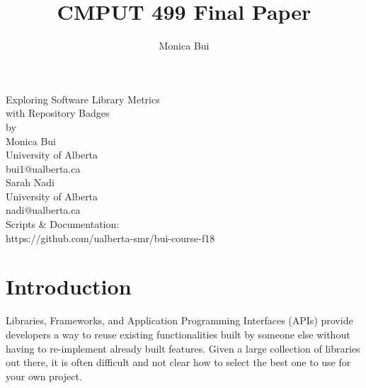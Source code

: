 \documentclass[12pt, letterpaper]{article}
\title{CMPUT 499 Final Paper}
\author{Monica Bui}
\begin{document}
\begin{titlepage}
    \centering
    \large
    \vspace{1cm}
    Exploring Software Library Metrics \\ 
    with Repository Badges \\
    \vspace{1cm}
    by \\
    \vspace{1cm}
    Monica Bui \\
    University of Alberta \\
    bui1@ualberta.ca \\
    \vspace{1cm}
    Sarah Nadi \\
    University of Alberta \\
    nadi@ualberta.ca \\
    \vspace{10cm}
    Scripts \& Documentation: \\
    https://github.com/ualberta-smr/bui-course-f18
\end{titlepage}

\tableofcontents

\listoffigures
\newpage

\section{Introduction} 

Libraries, Frameworks, and Application Programming Interfaces (APIs) provide developers 
a way to reuse existing functionalities
built by someone else without having to re-implement already built features. 
Given a large collection of libraries out there,
it is often difficult and not clear how to select the best one to use for your own project. 
\end{document}
